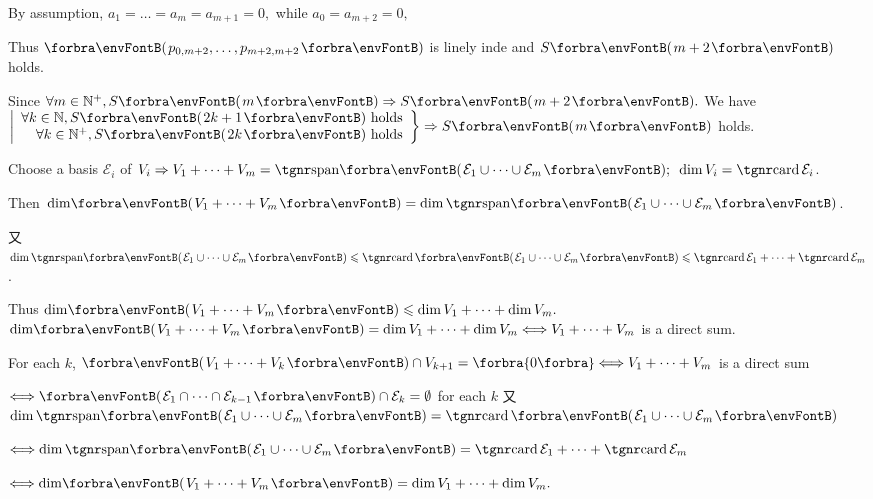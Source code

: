{\vspace{4pt}By assumption, $a_1=\dots=a_m=a_{m+1}=0,$ while $a_0=a_{m+2}=0,$}\par\quad\Hii
\vspace{6pt}Thus $\Par{p_{0,m+2},\dots,p_{m+2,m+2}}$ is linely inde and $S\Par{m+2}$ holds.\par\quad
Since $\forall m\in\Nbp,S\Par{m}\Rightarrow S\Par{m+2}.$ We have \;$\hMath[0pt]{r}{\left|}{\right\}}{\forall k\in\Nbb,S\Par{2k+1}\text{ holds}\\\forall k\in\Nbp,S\Par{2k}\text{ holds}}\Rightarrow S\Par{m}$ holds.\PfEnd
\SepLine

\par\quad
Choose a basis $ \mathcal{E}_i$ of $V_i\Rightarrow V_1+\dots+V_m=\Span{\mathcal{E}_1\cup\cdots\cup \mathcal{E}_m};\,\,\,\dim V_i=\card \mathcal{E}_i$.\par\quad
Then $\dim\!\Par{V_1+\dots+V_m}=\dim\Span{\mathcal{E}_1\cup\cdots\cup \mathcal{E}_m}$.\par\quad
又 $\dim\Span{\mathcal{E}_1\cup\cdots\cup\mathcal{E}_m}\leqslant\card\Par{\mathcal{E}_1\cup\cdots\cup \mathcal{E}_m}\leqslant\card \mathcal{E}_1+\cdots+\card \mathcal{E}_m$.\par\quad
Thus $\dim\!\Par{V_1+\dots+V_m}\leqslant \dim V_1+\dots+\dim V_m.$\PfEnd\vspace{6pt}
\Comment \,\,\,{\tgsl\Large$\dim\!\Par{V_1+\dots+V_m}=\dim V_1+\dots+\dim V_m\Longleftrightarrow V_1+\dots+V_m$ is a direct sum.}\par
\Blind{\Comment\,\,\,}For each $k$, $\Par{V_1+\dots+V_k}\cap V_{k+1}=\zeroSubs\Longleftrightarrow V_1+\dots+V_m$ is a direct sum\par
\Blind{\Comment\,\,\,}$\Longleftrightarrow\Par{\mathcal{E}_1\cap\dots\cap\mathcal{E}_{k-1}}\cap\mathcal{E}_k=\emptyset$ for each $k$ 又 $\dim\Span{\mathcal{E}_1\cup\dots\cup\mathcal{E}_m}=\card\Par{\mathcal{E}_1\cup\dots\cup\mathcal{E}_m}$\par
\Blind{\Comment\,\,\,}$\Longleftrightarrow\dim\Span{\mathcal{E}_1\cup\dots\cup\mathcal{E}_m}=\card\mathcal{E}_1+\dots+\card\mathcal{E}_m$\par
\Blind{\Comment\,\,\,}$\Longleftrightarrow\dim\!\Par{V_1+\dots+V_m}=\dim V_1+\dots+\dim V_m.$\PfEnd
\SepLine

